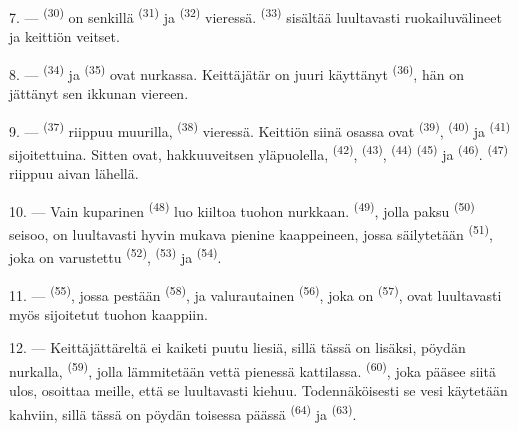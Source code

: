 7. ---  \textsuperscript{(30)} on senkillä
 \textsuperscript{(31)} ja 
\textsuperscript{(32)} vieressä.  \textsuperscript{(33)}
sisältää luultavasti ruokailuvälineet ja keittiön veitset.

8. ---  \textsuperscript{(34)} ja 
\textsuperscript{(35)} ovat nurkassa. Keittäjätär on juuri käyttänyt
 \textsuperscript{(36)}, hän on jättänyt sen ikkunan
viereen.

9. ---  \textsuperscript{(37)} riippuu muurilla,
 \textsuperscript{(38)} vieressä. Keittiön siinä osassa ovat
 \textsuperscript{(39)}, 
\textsuperscript{(40)} ja  \textsuperscript{(41)}
sijoitettuina. Sitten ovat, hakkuuveitsen yläpuolella, 
\textsuperscript{(42)},  \textsuperscript{(43)},
 \textsuperscript{(44)} 
\textsuperscript{(45)} ja  \textsuperscript{(46)}.
 \textsuperscript{(47)} riippuu aivan lähellä.

10. --- Vain kuparinen  \textsuperscript{(48)} luo kiiltoa tuohon
nurkkaan.  \textsuperscript{(49)}, jolla paksu  \textsuperscript{(50)} seisoo, on luultavasti hyvin mukava pienine
kaappeineen, jossa säilytetään  \textsuperscript{(51)},
joka on varustettu  \textsuperscript{(52)},
 \textsuperscript{(53)} ja 
\textsuperscript{(54)}.

\VUsaut{4.0mm}
\VUsaut{3.0mm}

11. ---  \textsuperscript{(55)}, jossa pestään
 \textsuperscript{(58)}, ja valurautainen 
\textsuperscript{(56)}, joka on  \textsuperscript{(57)},
ovat luultavasti myös sijoitetut tuohon kaappiin.

12. --- Keittäjättäreltä ei kaiketi puutu liesiä, sillä tässä on lisäksi, pöydän
nurkalla,  \textsuperscript{(59)}, jolla lämmitetään vettä
pienessä kattilassa.  \textsuperscript{(60)}, joka pääsee siitä
ulos, osoittaa meille, että se luultavasti kiehuu. Todennäköisesti se vesi
käytetään kahviin, sillä tässä on pöydän toisessa päässä
 \textsuperscript{(64)} ja 
\textsuperscript{(63)}.


